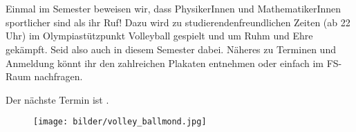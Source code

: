 \newpage\Large{}\normalfont\small\\ \quad \\

Einmal
im Semester beweisen wir, dass PhysikerInnen und MathematikerInnen sportlicher sind als ihr Ruf! Dazu wird zu studierendenfreundlichen Zeiten (ab 22 Uhr) im Olympiastützpunkt Volleyball gespielt und um Ruhm und Ehre gekämpft. Seid also auch in diesem Semester dabei. Näheres zu Terminen und Anmeldung könnt ihr den zahlreichen Plakaten entnehmen oder einfach im FS-Raum nachfragen.

Der nächste Termin ist \volley.

\iftrue
\vfill

\begin{figure}[h]
    \centering
    \texttt{[image: bilder/volley\_ballmond.jpg]}
\end{figure}

\vfill
\fi
